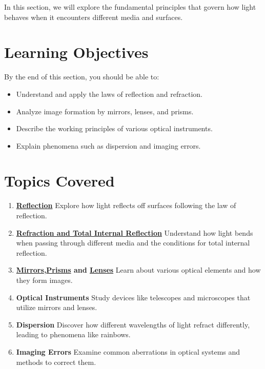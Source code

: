 \documentclass[
  a4paper,
]{book}
\providecommand{\tightlist}{%
  \setlength{\itemsep}{0pt}\setlength{\parskip}{0pt}}
\begin{document}
In this section, we will explore the fundamental principles that govern
how light behaves when it encounters different media and surfaces.

\section{\texorpdfstring{\textbf{Learning
Objectives}}{Learning Objectives}}\label{learning-objectives}

By the end of this section, you should be able to:

\begin{itemize}
\tightlist
\item
  Understand and apply the laws of reflection and refraction.
\item
  Analyze image formation by mirrors, lenses, and prisms.
\item
  Describe the working principles of various optical instruments.
\item
  Explain phenomena such as dispersion and imaging errors.
\end{itemize}

\section{\texorpdfstring{\textbf{Topics
Covered}}{Topics Covered}}\label{topics-covered}

\begin{enumerate}
\def\labelenumi{\arabic{enumi}.}
\item
  \textbf{\href{reflection.qmd}{Reflection}} Explore how light reflects
  off surfaces following the law of reflection.
\item
  \textbf{\href{refraction-total-internal-reflection.qmd}{Refraction and
  Total Internal Reflection}} Understand how light bends when passing
  through different media and the conditions for total internal
  reflection.
\item
  \textbf{\href{Optical\%20Elements\%20I.qmd}{Mirrors},\href{Optical\%20Elements\%20II.qmd}{Prisms}
  and \href{Optical\%20Elements\%20III.qmd}{Lenses} } Learn about
  various optical elements and how they form images.
\item
  \textbf{Optical Instruments} Study devices like telescopes and
  microscopes that utilize mirrors and lenses.
\item
  \textbf{Dispersion} Discover how different wavelengths of light
  refract differently, leading to phenomena like rainbows.
\item
  \textbf{Imaging Errors} Examine common aberrations in optical systems
  and methods to correct them.
\end{enumerate}
\end{document}
